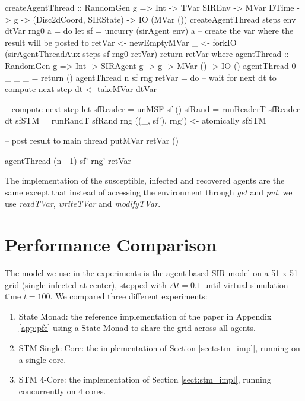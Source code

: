 \begin{HaskellCode}
createAgentThread :: RandomGen g 
                  => Int 
                  -> TVar SIREnv
                  -> MVar DTime
                  -> g
                  -> (Disc2dCoord, SIRState)
                  -> IO (MVar ())
createAgentThread steps env dtVar rng0 a = do
    let sf = uncurry (sirAgent env) a
    -- create the var where the result will be posted to
    retVar <- newEmptyMVar
    _ <- forkIO (sirAgentThreadAux steps sf rng0 retVar)
    return retVar
  where
    agentThread :: RandomGen g 
                => Int
                -> SIRAgent g
                -> g
                -> MVar ()
                -> IO ()
    agentThread 0 _ _ _ = return ()
    agentThread n sf rng retVar = do
      -- wait for next dt to compute next step
      dt <- takeMVar dtVar

      -- compute next step
      let sfReader = unMSF sf ()
          sfRand   = runReaderT sfReader dt
          sfSTM    = runRandT sfRand rng
      ((_, sf'), rng') <- atomically sfSTM 
      
      -- post result to main thread
      putMVar retVar ()
      
      agentThread (n - 1) sf' rng' retVar
\end{HaskellCode}

The implementation of the susceptible, infected and recovered agents are the same except that instead of accessing the environment through \textit{get} and \textit{put}, we use \textit{readTVar}, \textit{writeTVar} and \textit{modifyTVar}.

\section{Performance Comparison}
\label{sect:stm_perf}
The model we use in the experiments is the agent-based SIR model on a 51 x 51 grid (single infected at center), stepped with $\Delta t = 0.1$ until virtual simulation time $t=100$. We compared three different experiments:

\begin{enumerate}
	\item State Monad: the reference implementation of the paper in Appendix \ref{app:pfe} using a State Monad to share the grid across all agents.
	\item STM Single-Core: the implementation of Section \ref{sect:stm_impl}, running on a single core.
	\item STM 4-Core: the implementation of Section \ref{sect:stm_impl}, running concurrently on 4 cores.
\end{enumerate}

